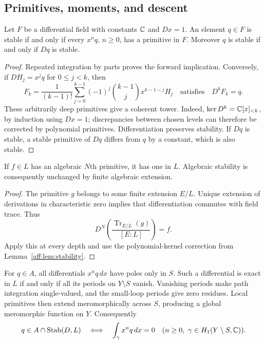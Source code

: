 \subsection{Primitives, moments, and descent}

\begin{lemma}\label{aff:lem:stability}
Let $F$ be a differential field with constants $\mathbb C$ and $Dx=1$.
An element $q\in F$ is stable if and only if every $x^nq$, $n\ge0$, has a
primitive in $F$. Moreover $q$ is stable if and only if $Dq$ is stable.
\end{lemma}
\begin{proof}
Repeated integration by parts proves the forward implication. Conversely,
if $DH_j=x^jq$ for $0\le j<k$, then
\[
 F_k=\frac1{(k-1)!}\sum_{j=0}^{k-1}(-1)^j\binom{k-1}{j}
                 x^{k-1-j}H_j
 \quad\text{satisfies}\quad D^kF_k=q.
\]
These arbitrarily deep primitives give a coherent tower. Indeed,
$\ker D^k=\mathbb C[x]_{<k}$, by induction using $Dx=1$; discrepancies between
chosen levels can therefore be corrected by polynomial primitives.
Differentiation preserves stability. If $Dq$ is stable, a stable primitive
of $Dq$ differs from $q$ by a constant, which is also stable.
\end{proof}

\begin{lemma}\label{aff:lem:trace}
If $f\in L$ has an algebraic $N$th primitive, it has one in $L$.
Algebraic stability is consequently unchanged by finite algebraic extension.
\end{lemma}
\begin{proof}
The primitive $g$ belongs to some finite extension $E/L$. Unique extension of
derivations in characteristic zero implies that differentiation commutes with
field trace. Thus
\[
 D^N\left(\frac{\operatorname{Tr}_{E/L}(g)}{[E:L]}\right)=f.
\]
Apply this at every depth and use the polynomial-kernel correction from
Lemma~\ref{aff:lem:stability}.
\end{proof}

For $q\in A$, all differentials $x^nq\,dx$ have poles only in $S$. Such a
differential is exact in $L$ if and only if all its periods on $Y\setminus S$
vanish. Vanishing periods make path integration single-valued, and the
small-loop periods give zero residues. Local primitives then extend
meromorphically across $S$, producing a global meromorphic function on $Y$.
Consequently
\begin{equation}\label{aff:eq:periods}
 q\in A\cap\operatorname{Stab}(D,L)
 \quad\Longleftrightarrow\quad
 \int_\gamma x^nq\,dx=0
 \quad(n\ge0,\ \gamma\in H_1(Y\setminus S,\mathbb C)).
\end{equation}

